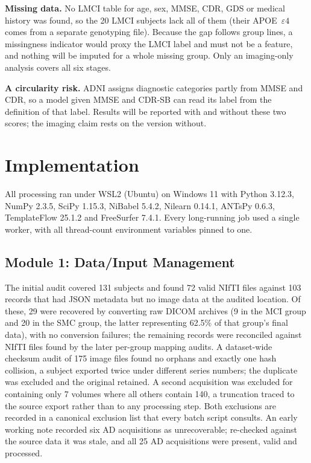 \documentclass{ssnreview}
\begin{document}
\textbf{Missing data.} No LMCI table for age, sex, MMSE, CDR, GDS or medical history was found, so the 20 LMCI
subjects lack all of them (their APOE~$\varepsilon4$ comes from a separate genotyping file). Because the gap follows
group lines, a missingness indicator would proxy the LMCI label and must not be a feature, and nothing will be imputed
for a whole missing group. Only an imaging-only analysis covers all six stages.

\textbf{A circularity risk.} ADNI assigns diagnostic categories partly from MMSE and CDR, so a model given MMSE and
CDR-SB can read its label from the definition of that label. Results will be reported with and without these two
scores; the imaging claim rests on the version without.

\chapter{Implementation}\label{ch:impl}

All processing ran under WSL2 (Ubuntu) on Windows 11 with Python 3.12.3, NumPy
2.3.5, SciPy 1.15.3, NiBabel 5.4.2, Nilearn 0.14.1, ANTsPy 0.6.3, TemplateFlow
25.1.2 and FreeSurfer 7.4.1. Every long-running job used a single worker, with all
thread-count environment variables pinned to one.

\section{Module 1: Data/Input Management}

The initial audit covered 131 subjects and found 72 valid NIfTI files against 103
records that had JSON metadata but no image data at the audited location. Of these, 29
were recovered by converting raw DICOM archives (9 in the MCI group and 20 in the
SMC group, the latter representing 62.5\% of that group's final data), with no
conversion failures; the remaining records were reconciled against NIfTI files found
by the later per-group mapping audits. A dataset-wide checksum audit of 175 image files found no
orphans and exactly one hash collision, a subject exported twice under different
series numbers; the duplicate was excluded and the original retained. A second
acquisition was excluded for containing only 7 volumes where all others contain 140,
a truncation traced to the source export rather than to any processing step. Both
exclusions are recorded in a canonical exclusion list that every batch script
consults. An early working note recorded six AD acquisitions as unrecoverable; re-checked
against the source data it was stale, and all 25 AD acquisitions were present, valid and
processed.
\end{document}
